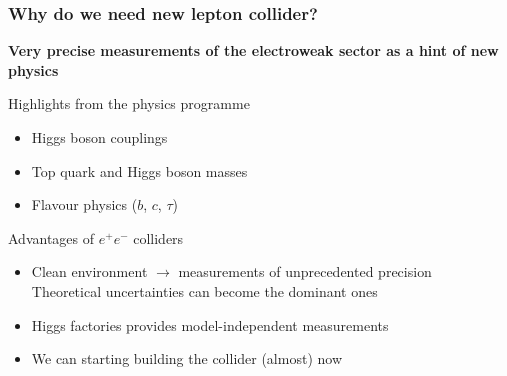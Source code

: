 \documentclass[aspectratio=169]{beamer}
\newcommand{\bluetext}[1]{%
  \textcolor{myBlue}{#1}
}
\begin{document}
\begin{frame}
  \frametitle{Why do we need new lepton collider?}

  \bluetext{{\bf Very precise measurements of the electroweak sector as a hint
  of new physics}} \\[2ex]
  \pause%

  \bluetext{Highlights from the physics programme}
  \begin{itemize}
    \item Higgs boson couplings
    \item Top quark and Higgs boson masses
    \item Flavour physics ($b$, $c$, $\tau$)
  \end{itemize}
  \pause%

  \bluetext{Advantages of $e^+e^-$ colliders}
  \begin{itemize}
    \item Clean environment $\rightarrow$ measurements of unprecedented precision\\
          Theoretical uncertainties can become the dominant ones
    \item Higgs factories provides model-independent measurements
    \item We can starting building the collider (almost) now
  \end{itemize}
\end{frame}
\end{document}
